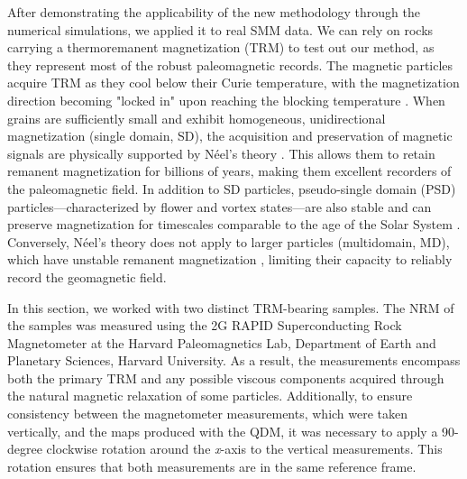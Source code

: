 After demonstrating the applicability of the new methodology through the numerical simulations, we applied it to real SMM data. We can rely on rocks carrying a thermoremanent magnetization (TRM) to test out our method, as they represent most of the robust paleomagnetic records. The magnetic particles \citep[most commonly magnetite,][]{OReilly1984} acquire TRM as they cool below their Curie temperature, with the magnetization direction becoming "locked in" upon reaching the blocking temperature \citep{Dunlop1997}. When grains are sufficiently small and exhibit homogeneous, unidirectional magnetization (single domain, SD), the acquisition and preservation of magnetic signals are physically supported by Néel’s theory \citep{Neel1949, Neel1955}. This allows them to retain remanent magnetization for billions of years, making them excellent recorders of the paleomagnetic field. In addition to SD particles, pseudo-single domain (PSD) particles—characterized by flower and vortex states—are also stable and can preserve magnetization for timescales comparable to the age of the Solar System \citep{Nagy2017, Lascu2018,Bellon-2024a}. Conversely, Néel’s theory does not apply to larger particles (multidomain, MD), which have unstable remanent magnetization \citep[e.g., due to viscous domain reorganization,][]{DeGroot2014}, limiting their capacity to reliably record the geomagnetic field. 

In this section, we worked with two distinct TRM-bearing samples. The NRM of the samples was measured using the 2G RAPID Superconducting Rock Magnetometer at the Harvard Paleomagnetics Lab, Department of Earth and Planetary Sciences, Harvard University. As a result, the measurements encompass both the primary TRM and any possible viscous components acquired through the natural magnetic relaxation of some particles. Additionally, to ensure consistency between the magnetometer measurements, which were taken vertically, and the maps produced with the QDM, it was necessary to apply a 90-degree clockwise rotation around the \textit{x}-axis to the vertical measurements. This rotation ensures that both measurements are in the same reference frame.

